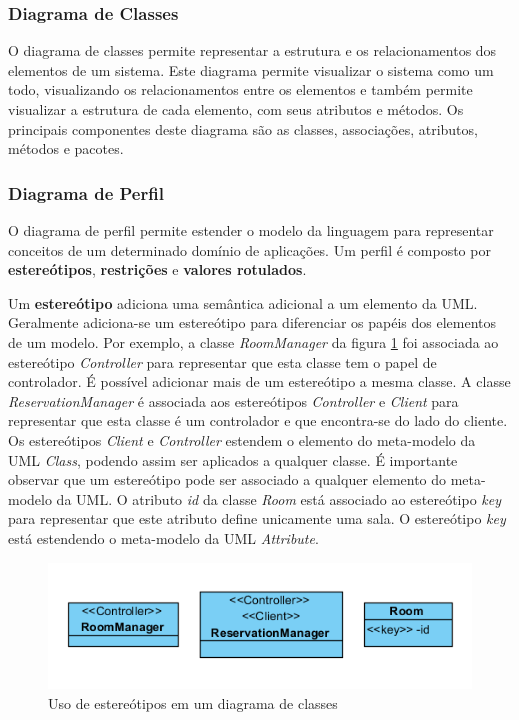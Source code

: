 \subsubsection{Diagrama de Classes}

O diagrama de classes permite representar a estrutura e os relacionamentos dos elementos de um sistema. Este diagrama permite visualizar o sistema
como um todo, visualizando os relacionamentos entre os elementos e também permite visualizar a estrutura de cada elemento, com seus atributos e
métodos. Os principais componentes deste diagrama são as classes, associações, atributos, métodos e pacotes.

\subsubsection{Diagrama de Perfil}

O diagrama de perfil permite estender o modelo da linguagem para representar conceitos de um determinado domínio de aplicações. Um perfil é composto
por \textbf{estereótipos}, \textbf{restrições} e \textbf{valores rotulados}. 

Um \textbf{estereótipo} adiciona uma semântica adicional a um elemento da UML. Geralmente adiciona-se um estereótipo para diferenciar os papéis dos
elementos de um modelo. Por exemplo, a classe \textit{RoomManager} da figura \ref{fig:stereotype_1} foi associada ao estereótipo \textit{Controller} 
para representar que esta classe tem o papel de controlador. É possível adicionar mais de um estereótipo a mesma classe. A classe
\textit{ReservationManager} é associada aos estereótipos \textit{Controller} e \textit{Client} para representar que esta classe é
um controlador e que encontra-se do lado do cliente. Os estereótipos \textit{Client} e \textit{Controller} estendem o elemento do 
meta-modelo da UML \textit{Class}, podendo assim ser aplicados a qualquer classe.  É importante observar que um estereótipo pode ser associado a
qualquer elemento do meta-modelo da UML. O atributo \textit{id} da classe \textit{Room} está associado ao estereótipo \textit{key} para representar
que este atributo define unicamente uma sala. O estereótipo \textit{key} está estendendo o meta-modelo da UML \textit{Attribute}.

\begin{figure}
	\centering
	\includegraphics{img/stereotype_1.png}
	\caption{Uso de estereótipos em um diagrama de classes}\label{fig:stereotype_1}
\end{figure}

